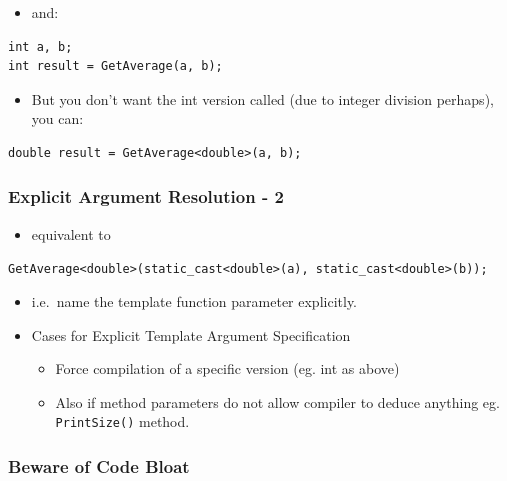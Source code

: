 \begin{itemize}
\itemsep1pt\parskip0pt
\item
  and:
\end{itemize}

\begin{verbatim}
int a, b;
int result = GetAverage(a, b);
\end{verbatim}

\begin{itemize}
\itemsep1pt\parskip0pt
\item
  But you don't want the int version called (due to integer division
  perhaps), you can:
\end{itemize}

\begin{verbatim}
double result = GetAverage<double>(a, b);
\end{verbatim}

\subsubsection{Explicit Argument Resolution -
2}\label{explicit-argument-resolution---2}

\begin{itemize}
\itemsep1pt\parskip0pt
\item
  equivalent to
\end{itemize}

\texttt{GetAverage\textless{}double\textgreater{}(static\_cast\textless{}double\textgreater{}(a), static\_cast\textless{}double\textgreater{}(b));}

\begin{itemize}
\item
  i.e.~name the template function parameter explicitly.
\item
  Cases for Explicit Template Argument Specification

  \begin{itemize}
  \itemsep1pt\parskip0pt
  \item
    Force compilation of a specific version (eg. int as above)
  \item
    Also if method parameters do not allow compiler to deduce anything
    eg. \texttt{PrintSize()} method.
  \end{itemize}
\end{itemize}

\subsubsection{Beware of Code Bloat}\label{beware-of-code-bloat}

